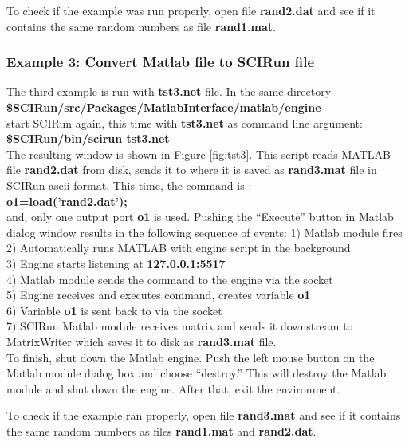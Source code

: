 To check if the example was run properly, open file {\bf rand2.dat}
and see if it contains the same random numbers as file {\bf rand1.mat}.

\subsubsection{Example 3: Convert Matlab file to SCIRun file} \indent

The third example is run with {\bf tst3.net} file. In the same
directory \\
{\bf \$SCIRun/src/Packages/MatlabInterface/matlab/engine } \\
start SCIRun again, this time with {\bf tst3.net} as command line argument: \\
{\bf \$SCIRun/bin/scirun  tst3.net} \\
The resulting window is shown in Figure \ref{fig:tst3}. This
script reads MATLAB file {\bf rand2.dat} from disk, sends
it to \sr{} where it is saved as {\bf rand3.mat} file
in SCIRun ascii format. This time, the command is : \\
{\bf o1=load('rand2.dat');} \\
and, only one output port {\bf o1} is used. Pushing the
``Execute'' button in Matlab dialog window results in
the following sequence of events:
1) Matlab module fires \\
2) Automatically runs MATLAB with engine script in the background  \\
3) Engine starts listening at {\bf 127.0.0.1:5517} \\
4) Matlab module sends the command to the engine via the socket\\
5) Engine receives and executes command, creates variable {\bf o1} \\
6) Variable {\bf o1} is sent back to \sr{} via the socket \\
7) SCIRun Matlab module receives matrix and sends it downstream
   to MatrixWriter which saves it to disk as {\bf rand3.mat} file. \\

To finish, shut down the Matlab engine.
Push the left mouse button on the
Matlab module dialog box and choose ``destroy.'' This will destroy
the Matlab module and shut down the engine. After that, exit
the \sr{} environment.

To check if the example ran properly, open file {\bf rand3.mat}
and see if it contains the same random numbers as files {\bf rand1.mat}
and {\bf rand2.dat}.


